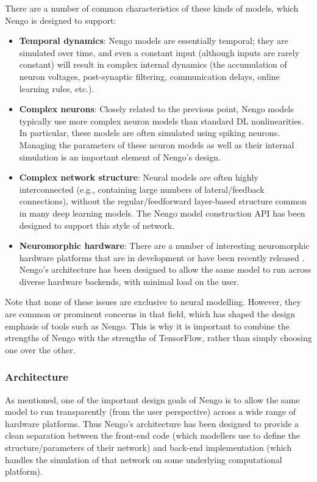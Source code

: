 \documentclass{article}
\begin{document}
There are a number of common characteristics of these kinds of models, which Nengo is designed to support:

\begin{itemize}
\item {\bf Temporal dynamics}: Nengo models are essentially temporal; they are simulated over time, and even a constant input (although inputs are rarely constant) will result in complex internal dynamics (the accumulation of neuron voltages, post-synaptic filtering, communication delays, online learning rules, etc.).
\item {\bf Complex neurons}: Closely related to the previous point, Nengo models typically use more complex neuron models than standard DL nonlinearities. In particular, these models are often simulated using spiking neurons.  Managing the parameters of these neuron models as well as their internal simulation is an important element of Nengo's design.
\item {\bf Complex network structure}: Neural models are often highly interconnected (e.g., containing large numbers of lateral/feedback connections), without the regular/feedforward layer-based structure common in many deep learning models.  The Nengo model construction API has been designed to support this style of network.
\item {\bf Neuromorphic hardware}: There are a number of interesting neuromorphic hardware platforms that are in development or have been recently released \citep{Khan2008,Benjamin2014,Davies2018}.  Nengo's architecture has been designed to allow the same model to run across diverse hardware backends, with minimal load on the user.
\end{itemize}

Note that none of these issues are exclusive to neural modelling.  However, they are common or prominent concerns in that field, which has shaped the design emphasis of tools such as Nengo.  This is why it is important to combine the strengths of Nengo with the strengths of TensorFlow, rather than simply choosing one over the other.

\subsubsection{Architecture}

As mentioned, one of the important design goals of Nengo is to allow the same model to run transparently (from the user perspective) across a wide range of hardware platforms.  Thus Nengo's architecture has been designed to provide a clean separation between the front-end code (which modellers use to define the structure/parameters of their network) and back-end implementation (which handles the simulation of that network on some underlying computational platform).  
\end{document}
